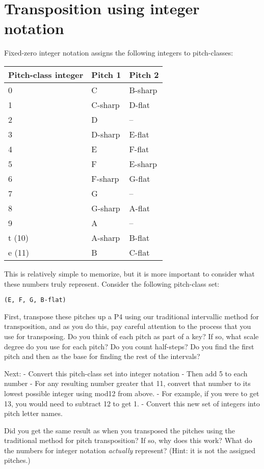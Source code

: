 \documentclass{book}
\begin{document}
\hypertarget{transposition-using-integer-notation}{%
\section{Transposition using integer
notation}\label{transposition-using-integer-notation}}

Fixed-zero integer notation assigns the following integers to pitch-classes:

\begin{longtable}[]{@{}lll@{}}
\toprule
Pitch-class integer & Pitch 1 & Pitch 2 \\
\midrule
\endhead
0 & C & B-sharp \\
1 & C-sharp & D-flat \\
2 & D & -- \\
3 & D-sharp & E-flat \\
4 & E & F-flat \\
5 & F & E-sharp \\
6 & F-sharp & G-flat \\
7 & G & -- \\
8 & G-sharp & A-flat \\
9 & A & -- \\
t (10) & A-sharp & B-flat \\
e (11) & B & C-flat \\
\bottomrule
\end{longtable}

This is relatively simple to memorize, but it is more important to consider
what these numbers truly represent. Consider the following pitch-class set:

\texttt{(E,\ F,\ G,\ B-flat)}

First, transpose these pitches up a P4 using our traditional intervallic
method for transposition, and as you do this, pay careful attention to the
process that you use for transposing. Do you think of each pitch as part of a
key? If so, what scale degree do you use for each pitch? Do you count
half-steps? Do you find the first pitch and then as the base for finding the
rest of the intervals?

Next: - Convert this pitch-class set into integer notation - Then add 5 to
each number - For any resulting number greater that 11, convert that number to
its lowest possible integer using mod12 from above. - For example, if you were
to get 13, you would need to subtract 12 to get 1. - Convert this new set of
integers into pitch letter names.

Did you get the same result as when you transposed the pitches using the
traditional method for pitch transposition? If so, why does this work? What do
the numbers for integer notation \emph{actually} represent? (Hint: it is not
the assigned pitches.)
\end{document}
